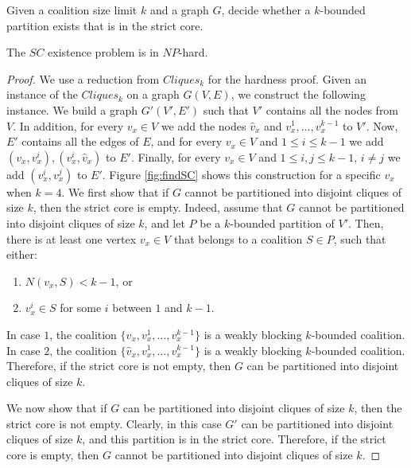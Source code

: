 \documentclass[sigconf,anonymous]{aamas}
\begin{document}
\begin{definition}
Given a coalition size limit $k$ and a graph $G$, decide whether a $k$-bounded partition exists that is in the strict core.
\end{definition}
\begin{theorem}
The $SC$ existence problem is in $NP$-hard.
\end{theorem}

\begin{proof}
We use a reduction from $Cliques_k$ for the hardness proof. Given an instance of the $Cliques_k$ on a graph $G(V,E)$, we construct the following instance. We build a graph $G'(V',E')$ such that $V'$ contains all the nodes from $V$. In addition, for every $v_x \in V$ we add the nodes $\hat{v}_x$ and $v_x^1,\ldots,v_x^{k-1}$ to $V'$. Now, $E'$ contains all the edges of $E$, and for every $v_x \in V$ and $1 \leq i \leq k-1$ we add $(v_x,v_x^i), (v_x^i, \hat{v}_x)$ to $E'$. Finally, for every $v_x \in V$ and $1 \leq i,j \leq k-1$, $i \neq j$ we add $(v_x^i, v_x^j)$ to $E'$. 
Figure \ref{fig:findSC} shows this construction for a specific $v_x$ when $k=4$.
We first show that if $G$ cannot be partitioned into disjoint cliques of size $k$, then the strict core is empty. Indeed, assume that $G$ cannot be partitioned into disjoint cliques of size $k$, and let $P$ be a $k$-bounded partition of $V'$. Then, there is at least one vertex $v_x \in V$ that belongs to a coalition $S\in P$, such that either:
\begin{enumerate}
    \item $N(v_x,S) < k-1$, or
    \item $v_x^i \in S$ for some $i$ between $1$ and $k-1$.
\end{enumerate}
In case $1$, the coalition $\{v_x, v_x^1, \ldots, v_x^{k-1}\}$ is a weakly blocking $k$-bounded coalition. In case $2$, the coalition $\{\hat{v}_x, v_x^1, \ldots, v_x^{k-1}\}$ is a weakly blocking $k$-bounded coalition.
Therefore, if the strict core is not empty, then $G$ can be partitioned into disjoint cliques of size $k$.

We now show that if $G$ can be partitioned into disjoint cliques of size $k$, then the strict core is not empty. Clearly, in this case $G'$ can be partitioned into disjoint cliques of size $k$, and this partition is in the strict core. Therefore, if the strict core is empty, then $G$ cannot be partitioned into disjoint cliques of size $k$.
\end{proof}
\end{document}
